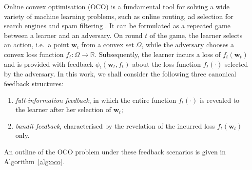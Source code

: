 Online convex optimisation (OCO) is a fundamental tool for solving a wide variety of machine learning problems, such as online routing, ad selection for search engines and spam filtering \citep{shalev-shwartz11, oco}. It can be formulated as a repeated game between a learner and an adversary. On round $t$ of the game, the learner selects an action, i.e.\ a point $\mathbf{w}_t$ from a convex set $\Omega$, while the adversary chooses a convex loss function $f_t : \Omega \rightarrow \mathbb{R}$. Subsequently, the learner incurs a loss of $f_t(\mathbf{w}_t)$ and is provided with feedback $\phi_t(\mathbf{w}_t, f_t)$ about the loss function $f_t(\cdot)$ selected by the adversary. In this work, we shall consider the following three canonical feedback structures:
\begin{enumerate}
	\item \emph{full-information feedback}, in which the entire function $f_t(\cdot)$ is revealed to the learner after her selection of $\mathbf{w}_t$;
	\item \emph{bandit feedback}, characterised by the revelation of the incurred loss $f_t(\mathbf{w}_t)$ only.
\end{enumerate}
An outline of the OCO problem under these feedback scenarios is given in Algorithm~\ref{alg:oco}.
